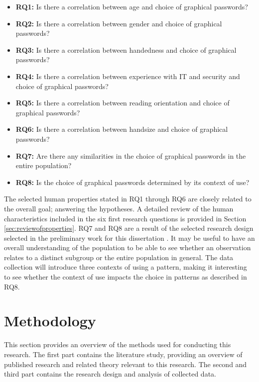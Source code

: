     {\renewcommand\labelitemi{}
      \begin{itemize}[leftmargin=*]
        \item {\bf RQ1:} Is there a correlation between age and choice of graphical passwords?
        \item {\bf RQ2:} Is there a correlation between gender and choice of graphical passwords?
        \item {\bf RQ3:} Is there a correlation between handedness and choice of graphical passwords?
        \item {\bf RQ4:} Is there a correlation between experience with IT and security and choice of graphical passwords?
        \item {\bf RQ5:} Is there a correlation between reading orientation and choice of graphical passwords?
        \item {\bf RQ6:} Is there a correlation between handsize and choice of graphical passwords?
        \item {\bf RQ7:} Are there any similarities in the choice of graphical passwords in the entire population?
        \item {\bf RQ8:} Is the choice of graphical passwords determined by its context of use?
      \end{itemize}
    }

    The selected human properties stated in RQ1 through RQ6 are closely related to the overall goal; answering the hypotheses. A detailed review of the human characteristics included in the six first research questions is provided in Section \ref{sec:reviewofproperties}. RQ7 and RQ8 are a result of the selected research design selected in the preliminary work for this dissertation \cite{prosjektoppgave}. It may be useful to have an overall understanding of the population to be able to see whether an observation relates to a distinct subgroup or the entire population in general. The data collection will introduce three contexts of using a pattern, making it interesting to see whether the context of use impacts the choice in patterns as described in RQ8.

  \section{Methodology} \label{sec:researchmethods}
    This section provides an overview of the methods used for conducting this research. The first part contains the literature study, providing an overview of published research and related theory relevant to this research. The second and third part contains the research design and analysis of collected data.

